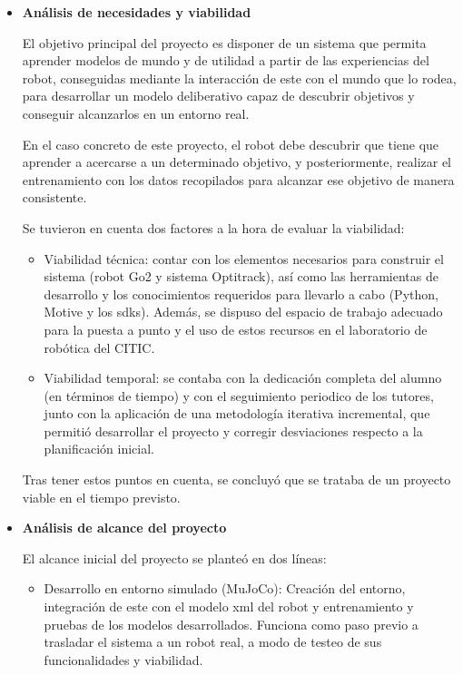 \begin{itemize}
    \item \textbf{Análisis de necesidades y viabilidad}

    El objetivo principal del proyecto es disponer de un sistema que permita aprender modelos de mundo y de utilidad a partir de las experiencias del 
    robot, conseguidas mediante la interacción de este con el mundo que lo rodea, para desarrollar un modelo deliberativo capaz de descubrir objetivos 
    y conseguir alcanzarlos en un entorno real. 

    En el caso concreto de este proyecto, el robot debe descubrir que tiene que aprender a acercarse a un determinado objetivo, y posteriormente, 
    realizar el entrenamiento con los datos recopilados para alcanzar ese objetivo de manera consistente.

    Se tuvieron en cuenta dos factores a la hora de evaluar la viabilidad:

    \begin{itemize}
        \item Viabilidad técnica: contar con los elementos necesarios para construir el sistema (robot Go2 y sistema Optitrack), así como las 
        herramientas de desarrollo y los conocimientos requeridos para llevarlo a cabo (Python, Motive y los \Gls{sdk}s). Además, se dispuso del 
        espacio de trabajo adecuado para la puesta a punto y el uso de estos recursos en el laboratorio de robótica del CITIC.

        \item Viabilidad temporal: se contaba con la dedicación completa del alumno (en términos de tiempo) y con el seguimiento periodico de 
        los tutores, junto con la aplicación de una metodología iterativa incremental, que permitió desarrollar el proyecto y corregir 
        desviaciones respecto a la planificación inicial.

    \end{itemize}

    Tras tener estos puntos en cuenta, se concluyó que se trataba de un proyecto viable en el tiempo previsto.

    \item \textbf{Análisis de alcance del proyecto}

    El alcance inicial del proyecto se planteó en dos líneas:

    \begin{itemize}
        \item Desarrollo en entorno simulado (MuJoCo): Creación del entorno, integración de este con el modelo \Gls{xml} del robot y 
        entrenamiento y pruebas de los modelos desarrollados. Funciona como paso previo a trasladar el sistema a un robot real, a modo de 
        testeo de sus funcionalidades y viabilidad.
        

\end{itemize}
\end{itemize}
